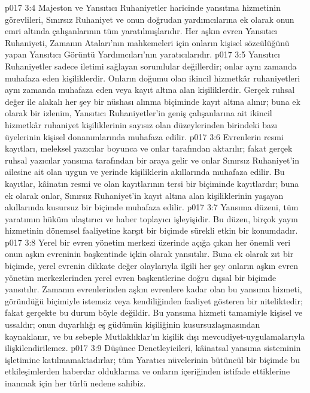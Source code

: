 \vs p017 3:4 Majeston ve Yansıtıcı Ruhaniyetler haricinde yansıtma hizmetinin görevlileri, Sınırsız Ruhaniyet ve onun doğrudan yardımcılarına ek olarak onun emri altında çalışanlarının tüm yaratılmışlarıdır. Her aşkın evren Yansıtıcı Ruhaniyeti, Zamanın Ataları’nın mahkemeleri için onların kişisel sözcülüğünü yapan Yansıtıcı Görüntü Yardımcıları’nın yaratıcılarıdır.
\vs p017 3:5 Yansıtıcı Ruhaniyetler sadece iletimi sağlayan sorumlular değillerdir; onlar aynı zamanda muhafaza eden kişiliklerdir. Onların doğumu olan ikincil hizmetkâr ruhaniyetleri aynı zamanda muhafaza eden veya kayıt altına alan kişiliklerdir. Gerçek ruhsal değer ile alakalı her şey bir nüshası alınma biçiminde kayıt altına alınır; buna ek olarak bir izlenim, Yansıtıcı Ruhaniyetler’in geniş çalışanlarına ait ikincil hizmetkâr ruhaniyet kişiliklerinin sayısız olan düzeylerinden birindeki bazı üyelerinin kişisel donanımlarında muhafaza edilir.
\vs p017 3:6 Evrenlerin resmi kayıtları, meleksel yazıcılar boyunca ve onlar tarafından aktarılır; fakat gerçek ruhsal yazıcılar yansıma tarafından bir araya gelir ve onlar Sınırsız Ruhaniyet’in ailesine ait olan uygun ve yerinde kişiliklerin akıllarında muhafaza edilir. Bu kayıtlar, kâinatın resmi ve  olan kayıtlarının tersi bir biçiminde  kayıtlardır; buna ek olarak onlar, Sınırsız Ruhaniyet’in kayıt altına alan kişiliklerinin yaşayan akıllarında kusursuz bir biçimde muhafaza edilir.
\vs p017 3:7 Yansıma düzeni, tüm yaratımın hüküm ulaştırıcı ve haber toplayıcı işleyişidir. Bu düzen, birçok yayın hizmetinin dönemsel faaliyetine karşıt bir biçimde sürekli etkin bir konumdadır.
\vs p017 3:8 Yerel bir evren yönetim merkezi üzerinde açığa çıkan her önemli veri onun aşkın evreninin başkentinde içkin olarak yansıtılır. Buna ek olarak zıt bir biçimde, yerel evrenin dikkate değer olaylarıyla ilgili her şey onların aşkın evren yönetim merkezlerinden yerel evren başkentlerine doğru dışsal bir biçimde yansıtılır. Zamanın evrenlerinden aşkın evrenlere kadar olan bu yansıma hizmeti, göründüğü biçimiyle istemsiz veya kendiliğinden faaliyet gösteren bir niteliktedir; fakat gerçekte bu durum böyle değildir. Bu yansıma hizmeti tamamiyle kişisel ve ussaldır; onun duyarlılığı eş güdümün kişiliğinin kusursuzlaşmasından kaynaklanır, ve bu sebeple Mutlaklıklar’ın kişilik dışı mevcudiyet\hyp{}uygulamalarıyla ilişkilendirilemez.
\vs p017 3:9 Düşünce Denetleyicileri, kâinatsal yansıma sisteminin işletimine katılmamaktadırlar; tüm Yaratıcı nüvelerinin bütüncül bir biçimde bu etkileşimlerden haberdar olduklarına ve onların içeriğinden istifade ettiklerine inanmak için her türlü nedene sahibiz.
